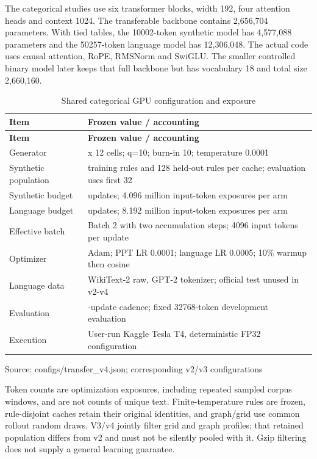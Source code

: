 \documentclass[11pt,a4paper]{article}
\begin{document}
The categorical studies use six transformer blocks, width 192, four attention heads and context 1024. The transferable backbone contains 2,656,704 parameters. With tied tables, the 10002-token synthetic model has 4,577,088 parameters and the 50257-token language model has 12,306,048. The actual code uses causal attention, RoPE, RMSNorm and SwiGLU. The smaller controlled binary model later keeps that full backbone but has vocabulary 18 and total size 2,660,160.

{\small
\begin{longtable}{>{\raggedright\arraybackslash}p{}>{\raggedright\arraybackslash}p{}}
\caption{Shared categorical GPU configuration and exposure}\\
\toprule
\textbf{Item} & \textbf{Frozen value /\allowbreak{} accounting} \\
\midrule\endfirsthead
\toprule
\textbf{Item} & \textbf{Frozen value /\allowbreak{} accounting} \\
\midrule\endhead
\bottomrule\endlastfoot
Generator & 12 x 12 cells; q=10; burn-in 10; temperature 0.0001 \\
Synthetic population & 4096 training rules and 128 held-out rules per cache; evaluation uses first 32 \\
Synthetic budget & 1000 updates; 4.096 million input-token exposures per arm \\
Language budget & 2000 updates; 8.192 million input-token exposures per arm \\
Effective batch & Batch 2 with two accumulation steps; 4096 input tokens per update \\
Optimizer & Adam; PPT LR 0.0001; language LR 0.0005; 10\% warmup then cosine \\
Language data & WikiText-2 raw, GPT-2 tokenizer; official test unused in v2-v4 \\
Evaluation & 100-update cadence; fixed 32768-token development evaluation \\
Execution & User-run Kaggle Tesla T4, deterministic FP32 configuration \\
\end{longtable}
}
{\footnotesize Source: configs/\allowbreak{}transfer\_\allowbreak{}v4.json; corresponding v2/\allowbreak{}v3 configurations\par}
Token counts are optimization exposures, including repeated sampled corpus windows, and are not counts of unique text. Finite-temperature rules are frozen, rule-disjoint caches retain their original identities, and graph/\allowbreak{}grid use common rollout random draws. V3/\allowbreak{}v4 jointly filter grid and graph profiles; that retained population differs from v2 and must not be silently pooled with it. Gzip filtering does not supply a general learning guarantee.
\end{document}
